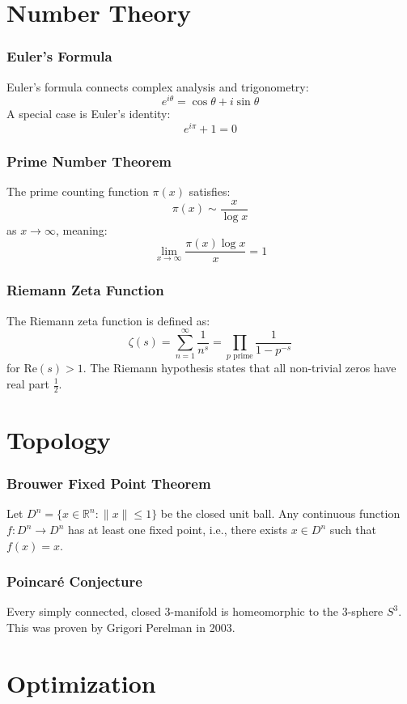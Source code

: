 \documentclass{beamer}
\begin{document}
\section{Number Theory}

\begin{frame}
\frametitle{Euler's Formula}
Euler's formula connects complex analysis and trigonometry:
\[
e^{i\theta} = \cos \theta + i \sin \theta
\]
A special case is Euler's identity:
\[
e^{i\pi} + 1 = 0
\]
\end{frame}

\begin{frame}
\frametitle{Prime Number Theorem}
The prime counting function $\pi(x)$ satisfies:
\[
\pi(x) \sim \frac{x}{\log x}
\]
as $x \to \infty$, meaning:
\[
\lim_{x \to \infty} \frac{\pi(x) \log x}{x} = 1
\]
\end{frame}

\begin{frame}
\frametitle{Riemann Zeta Function}
The Riemann zeta function is defined as:
\[
\zeta(s) = \sum_{n=1}^{\infty} \frac{1}{n^s} = \prod_{p \text{ prime}} \frac{1}{1 - p^{-s}}
\]
for $\text{Re}(s) > 1$. The Riemann hypothesis states that all non-trivial zeros have real part $\frac{1}{2}$.
\end{frame}

\section{Topology}

\begin{frame}
\frametitle{Brouwer Fixed Point Theorem}
Let $D^n = \{x \in \mathbb{R}^n : \|x\| \leq 1\}$ be the closed unit ball. Any continuous function $f: D^n \to D^n$ has at least one fixed point, i.e., there exists $x \in D^n$ such that $f(x) = x$.
\end{frame}

\begin{frame}
\frametitle{Poincaré Conjecture}
Every simply connected, closed 3-manifold is homeomorphic to the 3-sphere $S^3$. This was proven by Grigori Perelman in 2003.
\end{frame}

\section{Optimization}
\end{document}
